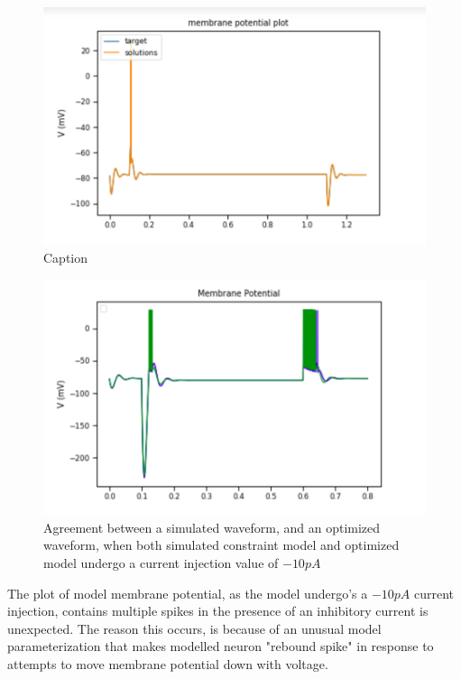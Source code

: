 

\begin{figure}
    \centering
    \includegraphics[scale=0.75]{figures/simulated_data_supra_threshold.png}
    \caption{Caption}
    \label{fig:my_label}
\end{figure}
\begin{figure}
    \centering
    \includegraphics[scale=0.75]{figures/simulated_data_sub_threshold.png}
    \caption{Agreement between a simulated waveform, and an optimized waveform, when both simulated constraint model and optimized model undergo a current injection value of $-10pA$}
    \label{fig:adexp_model_rebound_spike}
\end{figure}

The plot of model membrane potential, as the model undergo's a $-10pA$ current injection, contains multiple spikes in the presence of an inhibitory current is unexpected. The reason this occurs, is because of an unusual model parameterization that makes modelled neuron "rebound spike" in response to attempts to move membrane potential down with voltage.



